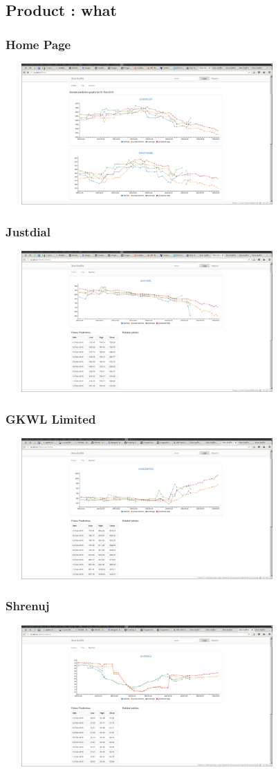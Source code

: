 \documentclass{beamer}
\begin{document}
\subsection{Product : what}
\begin{frame}
  \frametitle{Home Page}
  \includegraphics[height=5.4cm,width=10.8cm]{screenshot_2017-05-20_07-34-04.png}
\end{frame}
\begin{frame}
  \frametitle{Justdial}
  \includegraphics[height=5.4cm,width=10.8cm]{screenshot_2017-05-20_07-34-30.png}
\end{frame}
\begin{frame}
  \frametitle{GKWL Limited}
  \includegraphics[height=5.4cm,width=10.8cm]{screenshot_2017-05-20_07-36-44.png}
\end{frame}
\begin{frame}
  \frametitle{Shrenuj}
  \includegraphics[height=5.4cm,width=10.8cm]{screenshot_2017-05-20_07-36-50.png}
\end{frame}
\end{document}
